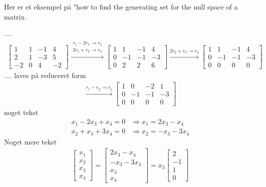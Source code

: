 Her er et eksempel på "how to find the generating set for the null space of a matrix.
\begin{example}
....
\begin{align*}
\begin{bmatrix}
    1 & 1 & -1 & 4 \\
    2 & 1 & -3 & 5\\
    -2 & 0 & 4 & -2
\end{bmatrix}\xrightarrow{\substack{r_1-2r_1\rightarrow r_2\\2r_1+r_3\rightarrow r_3}}
\begin{bmatrix}
    1 & 1 & -1 & 4 \\
    0 & -1 & -1 & -3\\
    0 & 2 & 2 & 6
\end{bmatrix}\xrightarrow{2r_2+r_3\rightarrow r_3}
\begin{bmatrix}
   1 & 1 & -1 & 4 \\
    0 & -1 & -1 & -3\\
    0 & 0 & 0 & 0 
\end{bmatrix}
\end{align*}
.... laves på reduceret form
\begin{align*}
\xrightarrow{r_1-r_2\rightarrow r_1}
\begin{bmatrix}
   1 & 0 & -2 & 1 \\
    0 & -1 & -1 & -3\\
    0 & 0 & 0 & 0
\end{bmatrix}
\end{align*}
noget tekst
\begin{align*}
    x_1 - 2x_3 + x_4 = 0 &\Rightarrow x_1 = 2x_3 - x_4\\
    x_2 + x_3 + 3x_4 = 0 &\Rightarrow x_2=-x_3 -3x_4
\end{align*}
Noget mere tekst
\begin{align*}
\begin{bmatrix}
   x_1\\x_2\\x_3\\x_4 
\end{bmatrix} =
\begin{bmatrix}
   2x_3 - x_4 \\ -x_3 -3x_4 \\ x_3 \\ x_4
\end{bmatrix} = x_3
\begin{bmatrix}
   2\\ -1\\ 1 \\0

\end{bmatrix}
\end{align*}
\end{example}
